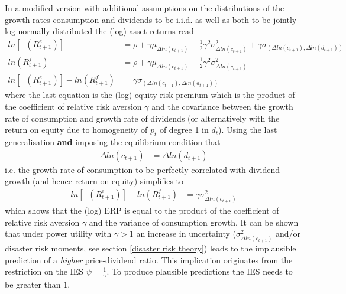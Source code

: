 In a modified version \cite{Mehra2008} with additional assumptions on the distributions of the growth rates consumption and dividends to be i.i.d. as well as both to be jointly log-normally distributed the (log) asset returns read
\begin{align*}
    ln[\mathop{\mathbb{E}_{t}} (R_{t+1}^{e})] &= \rho + \gamma \mu_{\Delta ln(c_{t+1})} - \frac{1}{2} \gamma^{2} \sigma_{\Delta ln(c_{t+1})}^{2} + \gamma \sigma_{(\Delta ln(c_{t+1}), \Delta ln(d_{t+1}))}\\
    ln(R_{t+1}^{f}) &= \rho + \gamma \mu_{\Delta ln(c_{t+1})} - \frac{1}{2} \gamma^{2} \sigma_{\Delta ln(c_{t+1})}^{2}\\
    ln[\mathop{\mathbb{E}_{t}} (R_{t+1}^{e})] - ln(R_{t+1}^{f}) &= \gamma \sigma_{(\Delta ln(c_{t+1}), \Delta ln(d_{t+1}))}
\end{align*}
where the last equation is the (log) equity risk premium which is the product of the coefficient of relative risk aversion $\gamma$ and the covariance between the growth rate of consumption and growth rate of dividends (or alternatively with the return on equity due to homogeneity of $p_t$ of degree 1 in $d_t$). Using the last generalisation \textbf{and} imposing the equilibrium condition that
\begin{align*}
    \Delta ln(c_{t+1}) &= \Delta ln(d_{t+1})
\end{align*}
i.e. the growth rate of consumption to be perfectly correlated with dividend growth (and hence return on equity) simplifies to
\begin{align*}
    ln[\mathop{\mathbb{E}_{t}} (R_{t+1}^{e})] - ln(R_{t+1}^{f}) &= \gamma \sigma_{\Delta ln(c_{t+1})}^{2}
\end{align*}
which shows that the (log) ERP is equal to the product of the coefficient of relative risk aversion $\gamma$ and the variance of consumption growth. It can be shown that under power utility with $\gamma > 1$ an increase in uncertainty ($\sigma_{\Delta ln(c_{t+1})}^{2}$ and/or disaster risk moments, see section \ref{disaster risk theory}) leads to the implausible prediction of a \textit{higher} price-dividend ratio. This implication originates from the restriction on the IES $\psi = \frac{1}{\gamma}$. To produce plausible predictions the IES needs to be greater than $1$.

